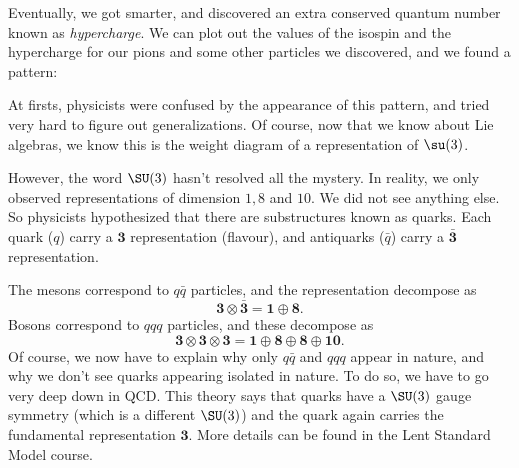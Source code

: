 \documentclass[a4paper]{article}
\begin{document}
Eventually, we got smarter, and discovered an extra conserved quantum number known as \emph{hypercharge}. We can plot out the values of the isospin and the hypercharge for our pions and some other particles we discovered, and we found a pattern:
\begin{center}
\end{center}
At firsts, physicists were confused by the appearance of this pattern, and tried very hard to figure out generalizations. Of course, now that we know about Lie algebras, we know this is the weight diagram of a representation of $\su(3)$.

However, the word $\SU(3)$ hasn't resolved all the mystery. In reality, we only observed representations of dimension $1, 8$ and $10$. We did not see anything else. So physicists hypothesized that there are substructures known as quarks. Each quark ($q$) carry a $\mathbf{3}$ representation (flavour), and antiquarks ($\bar{q}$) carry a $\bar{\mathbf{3}}$ representation.

The mesons correspond to $q\bar{q}$ particles, and the representation decompose as
\[
  \mathbf{3} \otimes \bar{\mathbf{3}} = \mathbf{1} \oplus \mathbf{8}.
\]
Bosons correspond to $qqq$ particles, and these decompose as
\[
  \mathbf{3} \otimes \mathbf{3} \otimes \mathbf{3} = \mathbf{1} \oplus \mathbf{8} \oplus \mathbf{8} \oplus \mathbf{10}.
\]
Of course, we now have to explain why only $q\bar{q}$ and $qqq$ appear in nature, and why we don't see quarks appearing isolated in nature. To do so, we have to go very deep down in QCD. This theory says that quarks have a $\SU(3)$ gauge symmetry (which is a different $\SU(3)$) and the quark again carries the fundamental representation $\mathbf{3}$. More details can be found in the Lent Standard Model course.
\printindex
\end{document}
